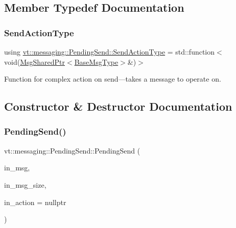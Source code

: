 \subsection{Member Typedef Documentation}
\mbox{\label{structvt_1_1messaging_1_1_pending_send_aa13248a342d68230048cde8e0756851c}} 
\subsubsection{\texorpdfstring{Send\+Action\+Type}{SendActionType}}
{\footnotesize\ttfamily using \hyperlink{structvt_1_1messaging_1_1_pending_send_aa13248a342d68230048cde8e0756851c}{vt\+::messaging\+::\+Pending\+Send\+::\+Send\+Action\+Type} =  std\+::function$<$void(\hyperlink{structvt_1_1messaging_1_1_msg_shared_ptr}{Msg\+Shared\+Ptr}$<$\hyperlink{namespacevt_a44d0d4e144748f2b19a1cfd962f50338}{Base\+Msg\+Type}$>$\&)$>$}



Function for complex action on send---takes a message to operate on. 



\subsection{Constructor \& Destructor Documentation}
\mbox{\label{structvt_1_1messaging_1_1_pending_send_a7ea1d6401329b5f2a1f2f4ca8d4fed40}} 
\subsubsection{\texorpdfstring{Pending\+Send()}{PendingSend()}\hspace{0.1cm}{\footnotesize\ttfamily [1/6]}}
{\footnotesize\ttfamily vt\+::messaging\+::\+Pending\+Send\+::\+Pending\+Send (\begin{DoxyParamCaption}\item[{\hyperlink{structvt_1_1messaging_1_1_msg_shared_ptr}{Msg\+Shared\+Ptr}$<$ \hyperlink{namespacevt_a44d0d4e144748f2b19a1cfd962f50338}{Base\+Msg\+Type} $>$ \&}]{in\+\_\+msg,  }\item[{\hyperlink{namespacevt_aab8d55968084610ce3b17057981e9300}{Byte\+Type}}]{in\+\_\+msg\+\_\+size,  }\item[{\hyperlink{structvt_1_1messaging_1_1_pending_send_aa13248a342d68230048cde8e0756851c}{Send\+Action\+Type}}]{in\+\_\+action = {\ttfamily nullptr} }\end{DoxyParamCaption})\hspace{0.3cm}{\ttfamily [inline]}}



